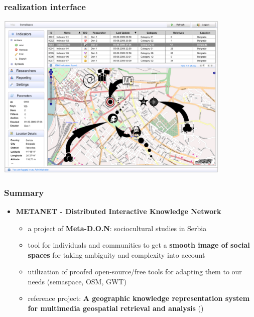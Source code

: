 \documentclass[blue]{beamer}
\begin{document}
\frame
{
\frametitle{\textbf{realization interface}}
\includegraphics[width=0.85\textwidth]{bin/features/metamap/02_gui_metamap_admin_start_update.png}
}


\frame
{
\frametitle{\textbf{Summary}}
\begin{itemize}
\item \textbf{METANET - Distributed Interactive Knowledge Network}
	\begin{itemize}
		\item a project of \textbf{Meta-D.O.N}: sociocultural studies in Serbia
		\item tool for individuals and communities to get a \textbf{smooth image of social spaces} for taking ambiguity and complexity into account
		\item utilization of proofed open-source/free tools for adapting them to our needs (semaspace, OSM, GWT)
		\item reference project: \textbf{A geographic knowledge representation system for multimedia geospatial retrieval and analysis}
		()
	\end{itemize}
\end{itemize}
}


\end{document}
